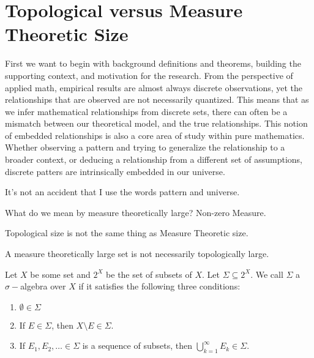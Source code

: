 \section{Topological versus Measure Theoretic Size}

First we want to begin with background definitions and theorems, building the supporting context, and motivation for the research.  From the perspective of applied math, empirical results are almost always discrete observations, yet the relationships that are observed are not necessarily quantized.  This means that as we infer mathematical relationships from discrete sets, there can often be a mismatch between our theoretical model, and the true relationships.  This notion of embedded relationships is also a core area of study within pure mathematics.  Whether observing a pattern and trying to generalize the relationship to a broader context, or deducing a relationship from a different set of assumptions, discrete patters are intrinsically embedded in our universe.  

It's not an accident that I use the words pattern and universe.  

What do we mean by measure theoretically large? Non-zero Measure.  

Topological size is not the same thing as Measure Theoretic size. 

A measure theoretically large set is not necessarily topologically large.  

\begin{definition}
    Let $X$ be some set and $2^X$ be the set of subsets of $X$. Let $\Sigma \subseteq 2^X$. We call $\Sigma$ a $\sigma-$algebra over $X$ if it satisfies the following three conditions:
    \begin{enumerate}
        \item $\emptyset \in \Sigma$
        \item If $E \in \Sigma$, then $X\setminus E \in \Sigma$. 
        \item If $E_1, E_2, \dots \in \Sigma$ is a sequence of subsets, then $\bigcup_{k=1}^\infty E_k \in \Sigma$. 
    \end{enumerate}
\end{definition}

